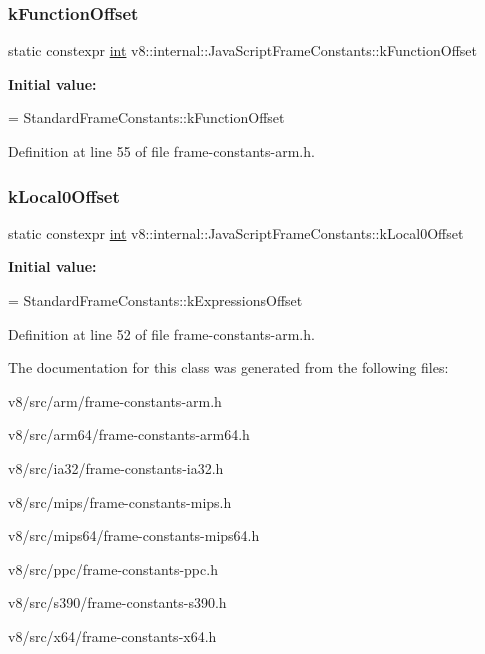 \subsubsection{\texorpdfstring{k\+Function\+Offset}{kFunctionOffset}}
{\footnotesize\ttfamily static constexpr \mbox{\hyperlink{classint}{int}} v8\+::internal\+::\+Java\+Script\+Frame\+Constants\+::k\+Function\+Offset\hspace{0.3cm}{\ttfamily [static]}}

{\bfseries Initial value\+:}
\begin{DoxyCode}
=
      StandardFrameConstants::kFunctionOffset
\end{DoxyCode}


Definition at line 55 of file frame-\/constants-\/arm.\+h.

\mbox{\label{classv8_1_1internal_1_1JavaScriptFrameConstants_a379d0d0ce8428ff7c85a5ed7b649d341}} 
\subsubsection{\texorpdfstring{k\+Local0\+Offset}{kLocal0Offset}}
{\footnotesize\ttfamily static constexpr \mbox{\hyperlink{classint}{int}} v8\+::internal\+::\+Java\+Script\+Frame\+Constants\+::k\+Local0\+Offset\hspace{0.3cm}{\ttfamily [static]}}

{\bfseries Initial value\+:}
\begin{DoxyCode}
=
      StandardFrameConstants::kExpressionsOffset
\end{DoxyCode}


Definition at line 52 of file frame-\/constants-\/arm.\+h.



The documentation for this class was generated from the following files\+:\begin{DoxyCompactItemize}
\item 
v8/src/arm/frame-\/constants-\/arm.\+h\item 
v8/src/arm64/frame-\/constants-\/arm64.\+h\item 
v8/src/ia32/frame-\/constants-\/ia32.\+h\item 
v8/src/mips/frame-\/constants-\/mips.\+h\item 
v8/src/mips64/frame-\/constants-\/mips64.\+h\item 
v8/src/ppc/frame-\/constants-\/ppc.\+h\item 
v8/src/s390/frame-\/constants-\/s390.\+h\item 
v8/src/x64/frame-\/constants-\/x64.\+h\end{DoxyCompactItemize}
